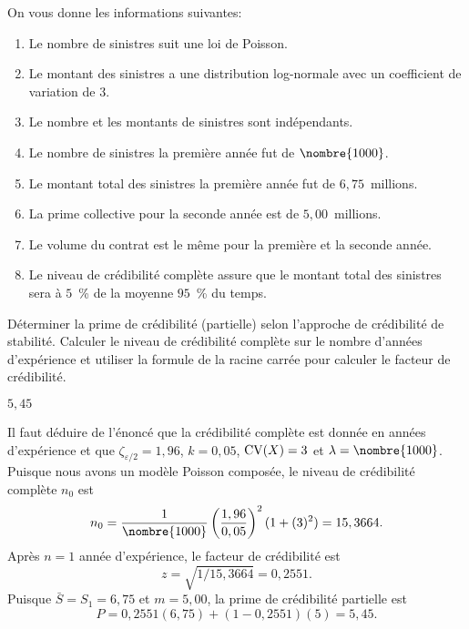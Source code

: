 \begin{exercice}
  On vous donne les informations suivantes:
  \begin{enumerate}[label=\roman*),labelsep=*,leftmargin=2em]
  \item Le nombre de sinistres suit une loi de Poisson.
  \item Le montant des sinistres a une distribution log-normale avec un
    coefficient de variation de $3$.
  \item Le nombre et les montants de sinistres sont indépendants.
  \item Le nombre de sinistres la première année fut de $\nombre{1000}$.
  \item Le montant total des sinistres la première année fut de
    $6,75$~millions.
  \item La prime collective pour la seconde année est de
    $5,00$~millions.
  \item Le volume du contrat est le même pour la première et la
    seconde année.
  \item Le niveau de crédibilité complète assure que le montant total
    des sinistres sera à $5$~\% de la moyenne $95$~\% du temps.
  \end{enumerate}
  Déterminer la prime de crédibilité (partielle) selon l'approche de
  crédibilité de stabilité. Calculer le niveau de crédibilité complète
  sur le nombre d'années d'expérience et utiliser la formule de la
  racine carrée pour calculer le facteur de crédibilité.
  \begin{rep}
    $5,45$
  \end{rep}
  \begin{sol}
    Il faut déduire de l'énoncé que la crédibilité complète est donnée
    en années d'expérience et que $\zeta_{\varepsilon/2} = 1,96$, $k =
    0,05$, $\operatorname{CV}(X) = 3$ et $\lambda = \nombre{1000}$. Puisque
    nous avons un modèle Poisson composée, le niveau de crédibilité
    complète $n_0$ est
    \begin{equation*}
      n_0 =
      \frac{1}{\nombre{1000}}
      \left( \frac{1,96}{0,05} \right)^2
      (1 + (3)^2) =
      15,3664.
    \end{equation*}
    Après $n = 1$ année d'expérience, le facteur de crédibilité est
    \begin{equation*}
      z = \sqrt{1/15,3664} = 0,2551.
    \end{equation*}
    Puisque $\bar{S} = S_1 = 6,75$ et $m = 5,00$, la prime de
    crédibilité partielle est
    \begin{equation*}
      P = 0,2551 (6,75) + (1 - 0,2551) (5) = 5,45.
    \end{equation*}
  \end{sol}
\end{exercice}

